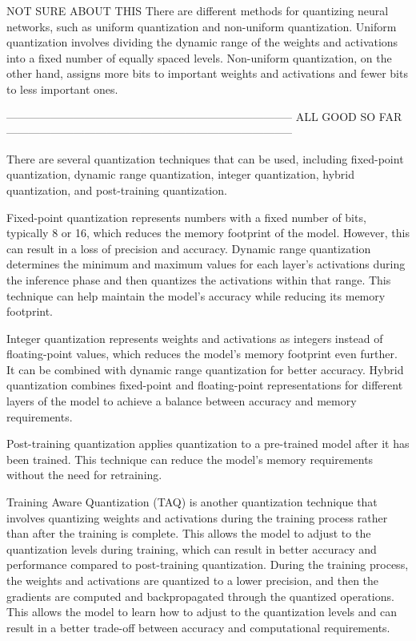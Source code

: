 NOT SURE ABOUT THIS
There are different methods for quantizing neural networks, such as uniform quantization and non-uniform quantization. Uniform quantization involves dividing the dynamic range of the weights and activations into a fixed number of equally spaced levels. Non-uniform quantization, on the other hand, assigns more bits to important weights and activations and fewer bits to less important ones.

-----------------------------------------------------------------------------
ALL GOOD SO FAR
-----------------------------------------------------------------------------

There are several quantization techniques that can be used, including fixed-point quantization, dynamic range quantization, integer quantization, hybrid quantization, and post-training quantization.

Fixed-point quantization represents numbers with a fixed number of bits, typically 8 or 16, which reduces the memory footprint of the model. However, this can result in a loss of precision and accuracy. Dynamic range quantization determines the minimum and maximum values for each layer's activations during the inference phase and then quantizes the activations within that range. This technique can help maintain the model's accuracy while reducing its memory footprint.

Integer quantization represents weights and activations as integers instead of floating-point values, which reduces the model's memory footprint even further. It can be combined with dynamic range quantization for better accuracy. Hybrid quantization combines fixed-point and floating-point representations for different layers of the model to achieve a balance between accuracy and memory requirements.

Post-training quantization applies quantization to a pre-trained model after it has been trained. This technique can reduce the model's memory requirements without the need for retraining.

Training Aware Quantization (TAQ) is another quantization technique that involves quantizing weights and activations during the training process rather than after the training is complete. This allows the model to adjust to the quantization levels during training, which can result in better accuracy and performance compared to post-training quantization. During the training process, the weights and activations are quantized to a lower precision, and then the gradients are computed and backpropagated through the quantized operations. This allows the model to learn how to adjust to the quantization levels and can result in a better trade-off between accuracy and computational requirements.

